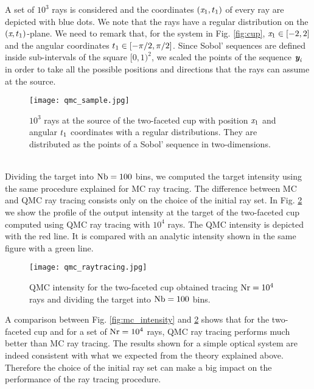 A set of $10^3$ rays is considered and the coordinates $(\textit{x}_1, t_1)$ of every ray are depicted with blue dots.
We note that the rays have a regular distribution on the $(\textit{x}, t_1)$-plane.
We need to remark that, for the system in Fig. \ref{fig:cup}, $\textit{x}_1 \in[-2,2]$ and the angular coordinates $t_1 \in[-\pi/2, \pi/2]$. 
Since Sobol' sequences are defined inside sub-intervals of the square $[0,1)^2$, we scaled the points of the sequence $\textit{\textbf{y}}_{\textit{i}}$ in order to take all the possible positions and directions that the rays can assume at the source. 
\begin{figure}[h]
\begin{center}
    \texttt{[image: qmc\_sample.jpg]}
    \caption{$10^3$ rays at the source of the two-faceted cup with position $\textit{x}_1$ and angular $t_1$ coordinates with a regular distributions.
They are distributed as the points of a Sobol' sequence in two-dimensions.}
    \label{fig:qmc_sample}
\end{center}
  \end{figure}
\\ \indent Dividing the target into $\textrm{Nb}=100$ bins, we computed the target intensity using the same procedure explained for MC ray tracing. 
The difference between MC and QMC ray tracing consists only on the choice of the initial ray set.
In Fig. \ref{fig:qmc_intensity} we show the profile of the output intensity at the target of the two-faceted cup computed using QMC ray tracing with $10^4$ rays. 
The QMC intensity is depicted with the red line. It is compared with an analytic intensity shown in the same figure with a green line.
\begin{figure}[t]
\begin{center}
    \texttt{[image: qmc\_raytracing.jpg]}
    \caption{QMC intensity for the two-faceted cup obtained tracing $\textrm{Nr}=10^4$ rays and dividing the target into $\textrm{Nb}=100$ bins.}
    \label{fig:qmc_intensity}
\end{center}
  \end{figure}
A comparison between Fig. \ref{fig:mc_intensity} and \ref{fig:qmc_intensity} shows that for the two-faceted cup and for a set of $\textrm{Nr}=10^4$ rays, QMC ray tracing performs much better than MC ray tracing. The results shown for a simple optical system are indeed consistent with what we expected from the theory explained above.
Therefore the choice of the initial ray set can make a big impact on the performance of the ray tracing procedure. 


























